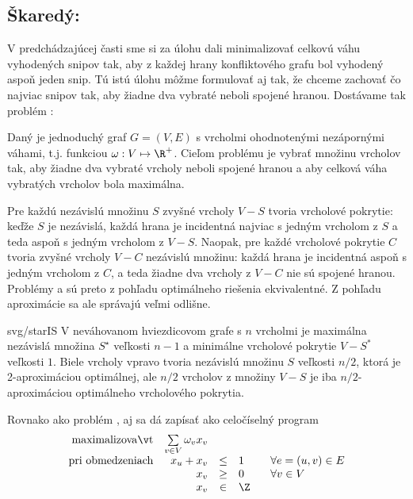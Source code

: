 \subsection*{Škaredý: \maxis}

\noindent
V predchádzajúcej časti sme si za úlohu dali minimalizovať celkovú váhu vyhodených snipov tak, aby z každej
hrany konfliktového grafu bol vyhodený aspoň jeden snip. Tú istú úlohu môžme formulovať aj tak, že chceme
zachovať čo najviac snipov tak, aby žiadne dva vybraté neboli spojené hranou. Dostávame tak 
problém \maxis:

\begin{framed}
  \begin{dfn}
Daný je jednoduchý graf $G=(V,E)$ s
vrcholmi ohodnotenými nezápornými váhami, t.j. funkciou $\omega:V\mapsto\R^+$.
Cieľom problému \maxis je vybrať množinu vrcholov tak, aby 
žiadne dva vybraté vrcholy neboli spojené hranou a aby celková váha vybratých vrcholov bola maximálna. 
\end{dfn}
\end{framed}

\noindent
Pre každú nezávislú množinu $S$ zvyšné vrcholy $V-S$ tvoria vrcholové pokrytie: keďže $S$ je nezávislá, každá
hrana je incidentná najviac s jedným vrcholom z $S$ a teda aspoň s jedným vrcholom z $V-S$. Naopak, 
pre každé vrcholové pokrytie $C$ tvoria zvyšné vrcholy $V-C$ nezávislú množinu: každá hrana je incidentná
aspoň s jedným vrcholom z $C$, a teda žiadne dva vrcholy z $V-C$ nie sú spojené hranou. Problémy
\minvcover a \maxis sú preto z pohľadu optimálneho riešenia ekvivalentné. Z pohľadu aproximácie sa ale
správajú veľmi odlišne.


\begin{myfig}{0.6\textwidth}{svg/starIS}
  V neváhovanom 
  hviezdicovom grafe s $n$ vrcholmi je maximálna nezávislá množina $S^\star$ veľkosti $n-1$ a minimálne vrcholové
  pokrytie $V-S^*$ veľkosti $1$. Biele vrcholy vpravo tvoria nezávislú množinu $S$ veľkosti $n/2$, ktorá
  je 2-aproximáciou optimálnej, ale $n/2$ vrcholov z množiny $V-S$ je iba $n/2$-aproximáciou optimálneho vrcholového pokrytia.
\end{myfig}

\noindent
Rovnako ako problém \minvcover, aj \maxis sa dá zapísať ako celočíselný program
\begin{equation}
\label{eq:ILP:a1}
\begin{array}{rrcll}
  {\rm maximalizovať}     & \multicolumn{1}{l}{\sum\limits_{v\in V}\omega_vx_v}\\
  {\rm pri\ obmedzeniach} & x_u + x_v&\le&1& \;\;\;\forall e=(u,v)\in E\\
                          & x_v&\ge&0& \;\;\;\forall v\in V\\
                          & x_v&\in&\Z
\end{array}
\end{equation}

